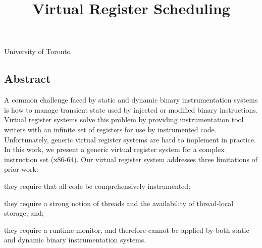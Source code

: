 \documentclass[preprint]{sigplanconf}
\begin{document}
\title{Virtual Register Scheduling}

{University of Toronto}{}

\maketitle
\subsection*{Abstract}

A common challenge faced by static and dynamic binary instrumentation
systems is how to manage transient state used by injected or modified binary
instructions. Virtual register systems solve this problem by providing
instrumentation tool writers with an infinite set of registers for use by
instrumented code. Unfortunately, generic virtual register systems are hard
to implement in practice. In this work, we present a generic virtual
register system for a complex instruction set (x86-64). Our virtual register
system addresses three limitations of prior work: %
\begin{inparaenum}[i)]
	\item they require that all code be comprehensively instrumented;
	\item they require a strong notion of threads and the availability of
 thread-local storage, and;
	\item they require a runtime monitor, and therefore cannot be applied
by both static and dynamic binary instrumentation systems.
\end{inparaenum}





% 

\end{document}
